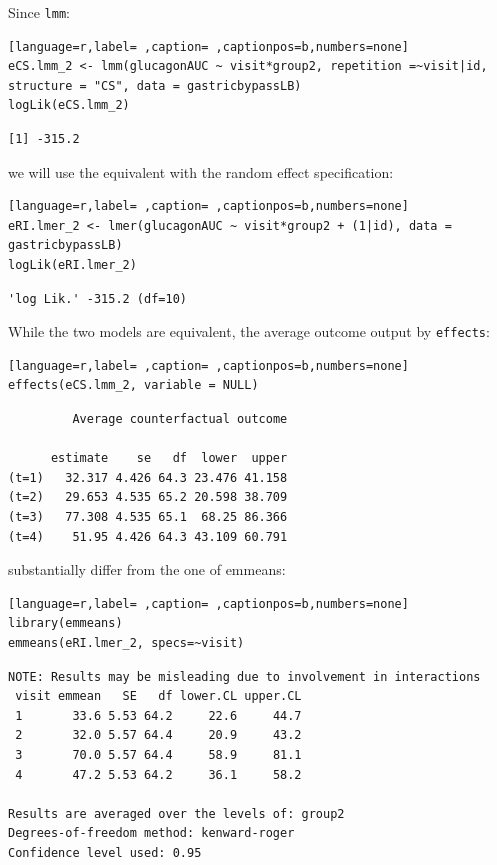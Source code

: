\documentclass[12pt]{article}
\begin{document}
Since \texttt{lmm}:
\begin{lstlisting}[language=r,label= ,caption= ,captionpos=b,numbers=none]
eCS.lmm_2 <- lmm(glucagonAUC ~ visit*group2, repetition =~visit|id, structure = "CS", data = gastricbypassLB)
logLik(eCS.lmm_2)
\end{lstlisting}

\begin{verbatim}
[1] -315.2
\end{verbatim}


we will use the equivalent with the random effect specification:

\begin{lstlisting}[language=r,label= ,caption= ,captionpos=b,numbers=none]
eRI.lmer_2 <- lmer(glucagonAUC ~ visit*group2 + (1|id), data = gastricbypassLB)
logLik(eRI.lmer_2)
\end{lstlisting}

\begin{verbatim}
'log Lik.' -315.2 (df=10)
\end{verbatim}


While the two models are equivalent, the average outcome output by
\texttt{effects}:
\begin{lstlisting}[language=r,label= ,caption= ,captionpos=b,numbers=none]
effects(eCS.lmm_2, variable = NULL)
\end{lstlisting}

\begin{verbatim}
	     Average counterfactual outcome

      estimate    se   df  lower  upper
(t=1)   32.317 4.426 64.3 23.476 41.158
(t=2)   29.653 4.535 65.2 20.598 38.709
(t=3)   77.308 4.535 65.1  68.25 86.366
(t=4)    51.95 4.426 64.3 43.109 60.791
\end{verbatim}


substantially differ from the one of emmeans:
\begin{lstlisting}[language=r,label= ,caption= ,captionpos=b,numbers=none]
library(emmeans)
emmeans(eRI.lmer_2, specs=~visit)
\end{lstlisting}

\begin{verbatim}
NOTE: Results may be misleading due to involvement in interactions
 visit emmean   SE   df lower.CL upper.CL
 1       33.6 5.53 64.2     22.6     44.7
 2       32.0 5.57 64.4     20.9     43.2
 3       70.0 5.57 64.4     58.9     81.1
 4       47.2 5.53 64.2     36.1     58.2

Results are averaged over the levels of: group2 
Degrees-of-freedom method: kenward-roger 
Confidence level used: 0.95
\end{verbatim}
\end{document}
